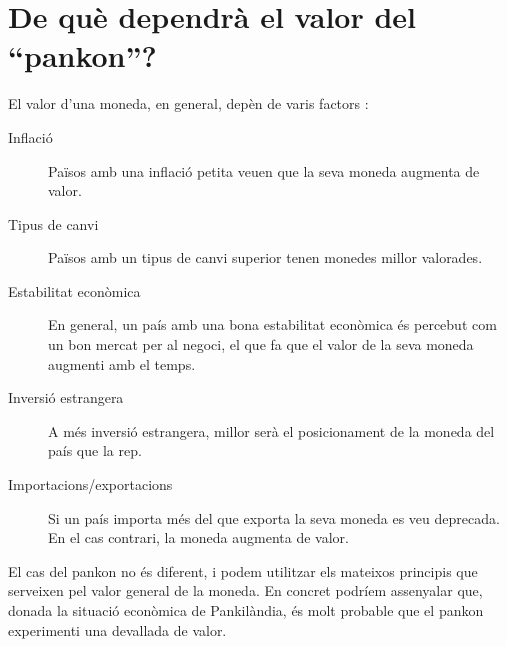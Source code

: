\section{De què dependrà el valor del ``pankon''?}

El valor d'una moneda, en general, depèn de varis factors 
\cite{currency_value}:

\begin{description}
  \item[Inflació] Països amb una inflació petita veuen que la seva moneda
  augmenta de valor.
  \item[Tipus de canvi] Països amb un tipus de canvi superior tenen monedes
  millor valorades.
  \item[Estabilitat econòmica] En general, un país amb una bona estabilitat
  econòmica és percebut com un bon mercat per al negoci, el que fa que
  el valor de la seva moneda augmenti amb el temps.
  \item[Inversió estrangera] A més inversió estrangera, millor serà el 
  posicionament de la moneda del país que la rep.
  \item[Importacions/exportacions] Si un país importa més del que exporta
  la seva moneda es veu deprecada. En el cas contrari, la moneda augmenta
  de valor.
\end{description}

El cas del pankon no és diferent, i podem utilitzar els mateixos principis
que serveixen pel valor general de la moneda. En concret podríem assenyalar
que, donada la situació econòmica de Pankilàndia, és molt probable que el
pankon experimenti una devallada de valor.

